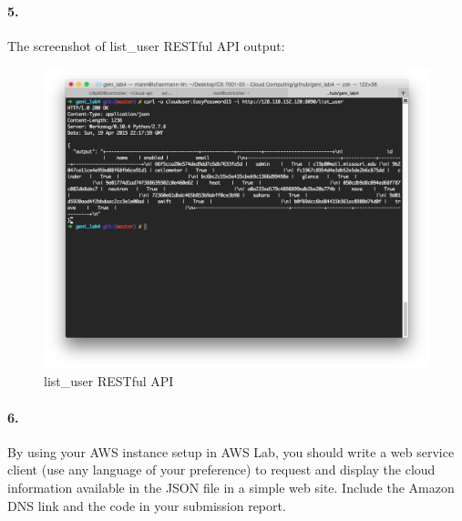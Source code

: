 \documentclass[a4paper]{article}
\begin{document}
\paragraph{5. } The screenshot of list\_user RESTful API output:
\begin{figure}[H]
  \centering
    \includegraphics[scale=.44]{list_user.png}
  \caption{list\_user RESTful API}
\end{figure}

\paragraph{6. } By using your AWS instance setup in AWS Lab, you should write a web service client (use any language of your preference) to request and display the cloud information available in the JSON file in a simple web site. Include the Amazon DNS link and the code in your submission report.
\end{document}
